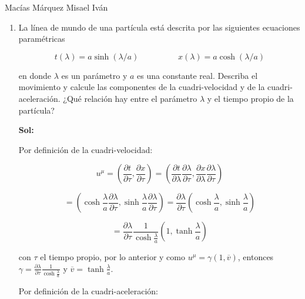 \documentclass[12pt,a4paper]{article}
\begin{document}
Macías Márquez Misael Iván

\begin{enumerate}






\item La línea de mundo de una partícula está descrita por las siguientes ecuaciones paramétricas

\begin{equation*}
    t(\lambda) = a \sinh{(\lambda/a)} \hspace{2cm} x(\lambda) = a \cosh{(\lambda/a)}
\end{equation*}

en donde $\lambda$ es un parámetro y $a$ es una constante real. Describa el movimiento y calcule las componentes de la cuadri-velocidad y de la cuadri-aceleración. ¿Qué relación hay entre el parámetro $\lambda$ y el tiempo propio de la partícula?

\textbf{Sol:}


Por definición de la cuadri-velocidad:

\begin{equation*}
    u ^{\mu} = \left(\frac{\partial t}{\partial \tau}, \frac{\partial x}{\partial \tau}\right) = \left(\frac{\partial t}{\partial \lambda} \frac{\partial \lambda}{\partial \tau},\frac{\partial x}{\partial \lambda} \frac{\partial \lambda}{\partial \tau}\right)
\end{equation*}

\begin{equation*}
    =\left(\cosh{\frac{\lambda}{a}}\frac{\partial \lambda}{\partial \tau}, \sinh{\frac{\lambda}{a}}\frac{\partial \lambda}{\partial \tau}\right) = \frac{\partial \lambda}{\partial \tau} \left(\cosh{\frac{\lambda}{a}},\sinh{\frac{\lambda}{a}}\right)
\end{equation*}

\begin{equation*}
    =\frac{\partial \lambda}{\partial \tau}\frac{1}{\cosh{\frac{\lambda}{a}}} \left(1,\tanh{\frac{\lambda}{a}}\right)
\end{equation*}

con $\tau$ el tiempo propio, por lo anterior y como $u^{\mu}=\gamma(1,\overline{v})$, entonces $\gamma = \frac{\partial \lambda}{\partial \tau}\frac{1}{\cosh{\frac{\lambda}{a}}}$ y $\overline{v} = \tanh{\frac{\lambda}{a}}$.

Por definición de la cuadri-aceleración:


\end{enumerate}
\end{document}
